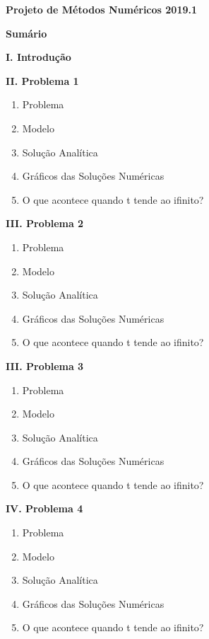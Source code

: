 \documentclass[a4paper, 12pt]{article}
\begin{document}
	\begin{center}
		\textbf{Projeto de Métodos Numéricos 2019.1}
	\end{center}
	\begin{center}
		\textbf{Sumário}
	\end{center}
	\begin{flushleft}		
		\textbf{I. Introdução}
		\item
		\textbf{II. Problema 1}
		\begin{enumerate}
			\item
				Problema
			\item
				Modelo
			\item
				Solução Analítica
			\item
				Gráficos das Soluções Numéricas
			\item
				O que acontece quando t tende ao ifinito?
		\end{enumerate}
		\textbf{III. Problema 2}
		\begin{enumerate}
			\item
				Problema
			\item
				Modelo
			\item
				Solução Analítica
			\item
				Gráficos das Soluções Numéricas
			\item
				O que acontece quando t tende ao ifinito?
		\end{enumerate}
		\textbf{III. Problema 3}
		\begin{enumerate}
			\item
				Problema
			\item
				Modelo
			\item
				Solução Analítica
			\item
				Gráficos das Soluções Numéricas
			\item
				O que acontece quando t tende ao ifinito?
		\end{enumerate}
		\textbf{IV. Problema 4}
		\begin{enumerate}
			\item
				Problema
			\item
				Modelo
			\item
				Solução Analítica
			\item
				Gráficos das Soluções Numéricas
			\item
				O que acontece quando t tende ao ifinito?
		\end{enumerate}
	\end{flushleft}
\end{document}

